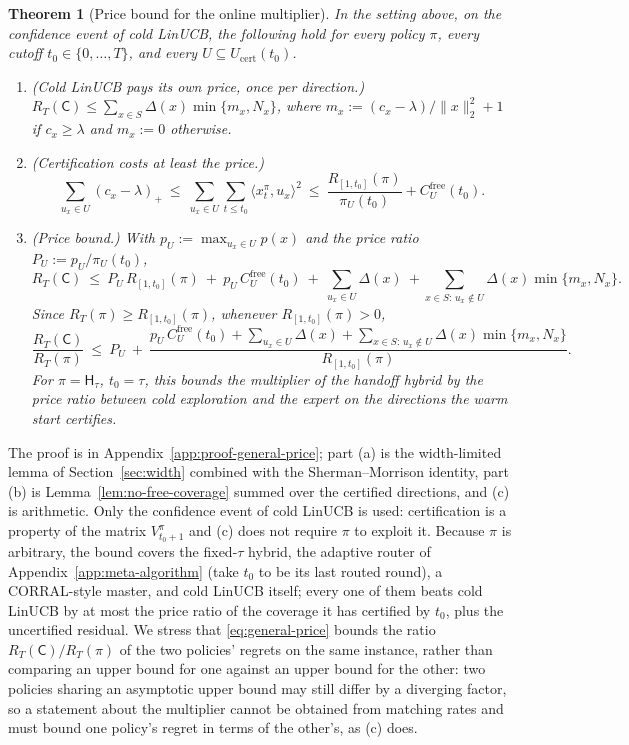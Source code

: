 \documentclass{article}
\newtheorem{theorem}{Theorem}
\theoremstyle{definition}
\theoremstyle{remark}
\theoremstyle{remark}
\newcommand{\Cold}{\mathsf{C}}
\newcommand{\Hyb}{\mathsf{H}}
\begin{document}
\begin{theorem}[Price bound for the online multiplier]
\label{thm:general-price}
In the setting above, on the confidence event of cold LinUCB, the following
hold for every policy $\pi$, every cutoff $t_0\in\{0,\dots,T\}$, and every
$U\subseteq U_{\mathrm{cert}}(t_0)$.
\begin{enumerate}[itemsep=1pt,topsep=1pt,leftmargin=*]
\item[(a)] \emph{(Cold LinUCB pays its own price, once per direction.)}
$R_T(\Cold)\le\sum_{x\in S}\Delta(x)\min\{m_x,N_x\}$, where
$m_x:=(c_x-\lambda)/\|x\|_2^2+1$ if $c_x\ge\lambda$ and $m_x:=0$ otherwise.
\item[(b)] \emph{(Certification costs at least the price.)}
\[
\sum_{u_x\in U}(c_x-\lambda)_+\ \le\ \sum_{u_x\in U}\sum_{t\le t_0}\langle x^\pi_t,u_x\rangle^2
\ \le\ \frac{R_{[1,t_0]}(\pi)}{\pi_U(t_0)}+C^{\mathrm{free}}_U(t_0).
\]
\item[(c)] \emph{(Price bound.)} With $p_U:=\max_{u_x\in U}p(x)$ and the
price ratio $P_U:=p_U/\pi_U(t_0)$,
\[
R_T(\Cold)\ \le\ P_U\,R_{[1,t_0]}(\pi)\ +\ p_U\,C^{\mathrm{free}}_U(t_0)\ +\ \sum_{u_x\in U}\Delta(x)
\ +\sum_{x\in S:\,u_x\notin U}\Delta(x)\min\{m_x,N_x\}.
\]
Since $R_T(\pi)\ge R_{[1,t_0]}(\pi)$, whenever $R_{[1,t_0]}(\pi)>0$,
\begin{equation}
\label{eq:general-price}
\frac{R_T(\Cold)}{R_T(\pi)}\ \le\ P_U\ +\
\frac{p_U\,C^{\mathrm{free}}_U(t_0)+\sum_{u_x\in U}\Delta(x)+\sum_{x\in S:\,u_x\notin U}\Delta(x)\min\{m_x,N_x\}}{R_{[1,t_0]}(\pi)} .
\end{equation}
For $\pi=\Hyb_\tau$, $t_0=\tau$, this bounds the multiplier of the handoff
hybrid by the price ratio between cold exploration and the expert on the
directions the warm start certifies.
\end{enumerate}
\end{theorem}

The proof is in Appendix~\ref{app:proof-general-price}; part (a) is the
width-limited lemma of Section~\ref{sec:width} combined with the
Sherman--Morrison identity, part (b) is Lemma~\ref{lem:no-free-coverage}
summed over the certified directions, and (c) is arithmetic. Only the
confidence event of cold LinUCB is used: certification is a property of the
matrix $V^\pi_{t_0+1}$ and (c) does not require $\pi$ to exploit it. Because
$\pi$ is arbitrary, the bound covers the fixed-$\tau$ hybrid, the adaptive
router of Appendix~\ref{app:meta-algorithm} (take $t_0$ to be its last routed
round), a CORRAL-style master, and cold LinUCB itself; every one of them
beats cold LinUCB by at most the price ratio of the coverage it has certified
by $t_0$, plus the uncertified residual. We stress that
\eqref{eq:general-price} bounds the ratio $R_T(\Cold)/R_T(\pi)$ of the two
policies' regrets on the same instance, rather than comparing an upper bound
for one against an upper bound for the other: two policies sharing an
asymptotic upper bound may still differ by a diverging factor, so a
statement about the multiplier cannot be obtained from matching rates and
must bound one policy's regret in terms of the other's, as (c) does.
\end{document}
